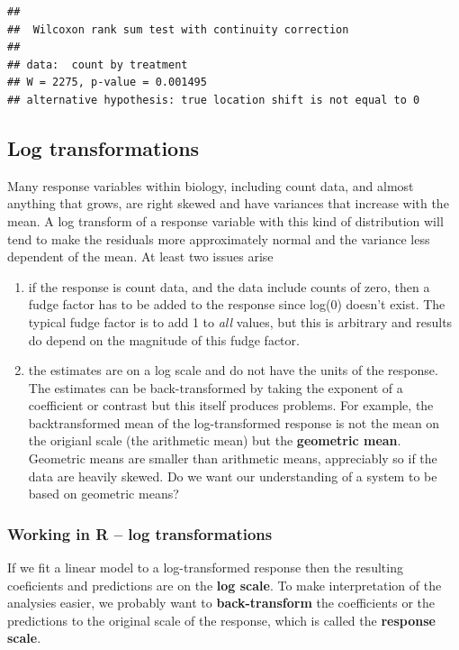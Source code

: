 \documentclass[]{book}
\providecommand{\tightlist}{%
  \setlength{\itemsep}{0pt}\setlength{\parskip}{0pt}}
\begin{document}
\begin{verbatim}
## 
##  Wilcoxon rank sum test with continuity correction
## 
## data:  count by treatment
## W = 2275, p-value = 0.001495
## alternative hypothesis: true location shift is not equal to 0
\end{verbatim}

\subsection{Log transformations}\label{log-transformations}

Many response variables within biology, including count data, and almost
anything that grows, are right skewed and have variances that increase
with the mean. A log transform of a response variable with this kind of
distribution will tend to make the residuals more approximately normal
and the variance less dependent of the mean. At least two issues arise

\begin{enumerate}
\def\labelenumi{\arabic{enumi}.}
\tightlist
\item
  if the response is count data, and the data include counts of zero,
  then a fudge factor has to be added to the response since log(0)
  doesn't exist. The typical fudge factor is to add 1 to \emph{all}
  values, but this is arbitrary and results do depend on the magnitude
  of this fudge factor.
\item
  the estimates are on a log scale and do not have the units of the
  response. The estimates can be back-transformed by taking the exponent
  of a coefficient or contrast but this itself produces problems. For
  example, the backtransformed mean of the log-transformed response is
  not the mean on the origianl scale (the arithmetic mean) but the
  \textbf{geometric mean}. Geometric means are smaller than arithmetic
  means, appreciably so if the data are heavily skewed. Do we want our
  understanding of a system to be based on geometric means?
\end{enumerate}

\subsubsection{Working in R -- log
transformations}\label{working-in-r-log-transformations}

If we fit a linear model to a log-transformed response then the
resulting coeficients and predictions are on the \textbf{log scale}. To
make interpretation of the analysies easier, we probably want to
\textbf{back-transform} the coefficients or the predictions to the
original scale of the response, which is called the \textbf{response
scale}.
\end{document}
